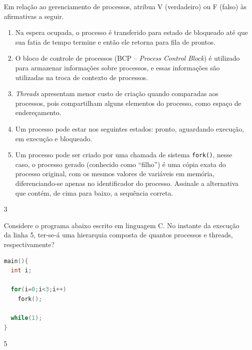 {
\def\AMCbeginQuestion#1#2{\par\noindent{\bf (POSCOMP 2014 - Questão 50)}}
\begin{question}{} Em relação ao gerenciamento de processos, atribua V (verdadeiro) ou F (falso) às afirmativas a seguir.
\begin{enumerate}[label=(\ \ )]
\item Na espera ocupada, o processo é transferido para estado de bloqueado até que sua fatia de tempo termine e então ele retorna para fila de prontos.

\item O bloco de controle de processos (BCP -- \textit{Process Control Block}) é utilizado para armazenar informações sobre processos, e essas informações são utilizadas na troca de contexto de processos.

\item \textit{Threads} apresentam menor custo de criação quando comparadas aos processos, pois compartilham alguns elementos do processo, como espaço de endereçamento.

\item Um processo pode estar nos seguintes estados: pronto, aguardando execução, em execução e bloqueado.

\item Um processo pode ser criado por uma chamada de sistema \texttt{fork()}, nesse caso, o processo gerado (conhecido como ``filho'') é uma cópia exata do processo original, com os mesmos valores de variáveis em memória, diferenciando-se apenas no identificador do processo.
Assinale a alternativa que contém, de cima para baixo, a sequência correta.
\end{enumerate}

\begin{multicols}{3}\columnseprule=0.1pt
\begin{choices}
\end{choices}
\end{multicols}
\end{question}
}
%
%
%
{
\def\AMCbeginQuestion#1#2{\par\noindent{\bf (POSCOMP 2019 - Questão 45)}}
\begin{question}{} Considere o programa abaixo escrito em linguagem C. No instante da execução da linha 5, ter-se-á uma hierarquia composta de quantos processos e threads, respectivamente?
\begin{lstlisting}[language=C]
main(){
  int i;

  for(i=0;i<3;i++)
    fork();

  while(1);
}
\end{lstlisting}
\begin{multicols}{5}\columnseprule=0.1pt
\begin{choices}
\end{choices}
\end{multicols}
\end{question}
}
